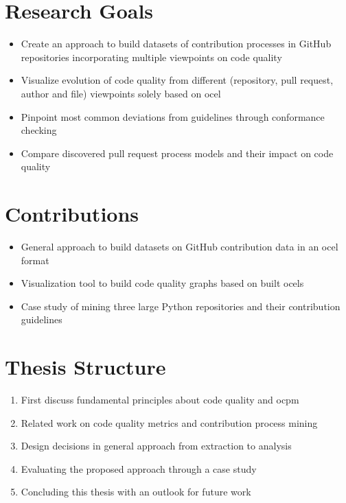 \section{Research Goals}
\label{sec:intro_ssec:rgs}
\begin{itemize}
	\item Create an approach to build datasets of contribution processes in GitHub repositories incorporating multiple viewpoints on code quality
	\item Visualize evolution of code quality from different (repository, pull request, author and file) viewpoints solely based on \ac{ocel}
	\item Pinpoint most common deviations from guidelines through conformance checking 
	\item Compare discovered pull request process models and their impact on code quality
\end{itemize}


\section{Contributions}
\label{sec:intro_ssec:c}
\begin{itemize}
	\item General approach to build datasets on GitHub contribution data in an \ac{ocel} format
	\item Visualization tool to build code quality graphs based on built \acp{ocel}
	\item Case study of mining three large Python repositories and their contribution guidelines
\end{itemize}


\section{Thesis Structure}
\label{sec:intro_ssec:ts}
\begin{enumerate}
	\item First discuss fundamental principles about code quality and \ac{ocpm} 
	\item Related work on code quality metrics and contribution process mining
	\item Design decisions in general approach from extraction to analysis
	\item Evaluating the proposed approach through a case study
	\item Concluding this thesis with an outlook for future work
\end{enumerate}
